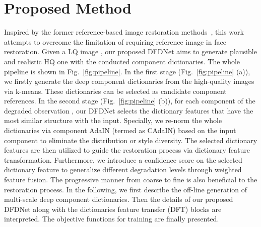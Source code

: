 \documentclass[runningheads]{llncs}
\begin{document}
\section{Proposed Method}\label{section3}

\begin{figure*}[!t]
\centering
	\caption{Overview of our proposed method. It mainly contains two parts: (a) the off-line generation of multi-scale component dictionaries from large amounts of high-quality images which have diverse poses and expressions. K-means is adopted to generate  clusters for each component (\ie, left/right eyes, nose and mouth) on different feature scales.
(b) The restoration process and dictionary feature transfer (DFT) block that are utilized to provide the reference details in a progressive manner. Here, DFT- block takes the Scale- component dictionaries for reference in the same feature level.}
	\label{fig:pipeline}
\end{figure*}
Inspired by the former reference-based image restoration methods~\cite{zhang2019image, li2018learning, dogan2019exemplar}, this work attempts to overcome the limitation of requiring reference image in face restoration. Given a LQ image , our proposed DFDNet aims to generate plausible and realistic HQ one  with the conducted component dictionaries. 
The whole pipeline is shown in Fig.~\ref{fig:pipeline}. In the first stage (Fig.~\ref{fig:pipeline} (a)), we firstly generate the deep component dictionaries from the high-quality images  via k-means. These dictionaries can be selected as candidate component references. In the second stage (Fig.~\ref{fig:pipeline} (b)), for each component of the degraded observation , 
our DFDNet selects the dictionary features that have the most similar structure with the input. 
Specially, we re-norm the whole dictionaries via component AdaIN (termed as CAdaIN) based on the input component to eliminate the distribution or style diversity. The selected dictionary features are then utilized to guide the restoration process via dictionary feature transformation. Furthermore, we introduce a confidence score on the selected dictionary feature to generalize different degradation levels through weighted feature fusion. The progressive manner from coarse to fine is also beneficial to the restoration process. In the following, we first describe the off-line generation of multi-scale deep component dictionaries. Then the details of our proposed DFDNet along with the dictionaries feature transfer (DFT) blocks are interpreted. The objective functions for training are finally presented.
\end{document}
